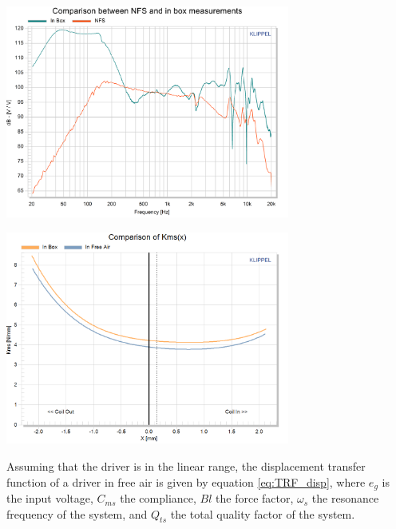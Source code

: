 \documentclass{report}
\begin{document}
\begin{minipage}{0.5\textwidth}
\begin{center}
	\includegraphics[width=0.7\textwidth]{RoomComp/Compa_NFS_BAffle} 
    \captionsetup{hypcap=false} 
	\label{fig:Load_Compa}
\end{center}
\end{minipage}
\begin{minipage}{0.5\textwidth}
\begin{center}
	\includegraphics[width=0.7\textwidth]{RoomComp/diff_kms} 
    \captionsetup{hypcap=false} 
	\label{fig:kms_comp}
\end{center}
\end{minipage}

\vspace{0.2cm}

Assuming that the driver is in the linear range, the displacement transfer function of a driver in free air is given by equation \ref{eq:TRF_disp}, where $ e_{g}$ is the input voltage, $C_{ms}$ the compliance, $Bl$ the force factor, $\omega_{s}$ the resonance frequency of the system, and $Q_{ts}$ the total quality factor of the system.
\end{document}
